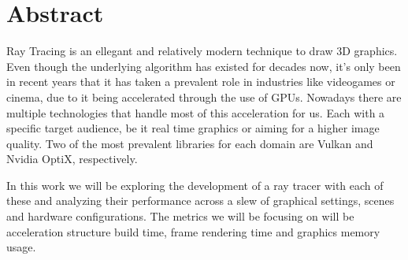 \newpage


\chapter*{Abstract}

Ray Tracing is an ellegant and relatively modern technique to draw 3D graphics. Even though the underlying algorithm has existed for decades now, it's only been in recent years that it has taken a prevalent role in industries like videogames or cinema, due to it being accelerated through the use of GPUs. Nowadays there are multiple technologies that handle most of this acceleration for us. Each with a specific target audience, be it real time graphics or aiming for a higher image quality. Two of the most prevalent libraries for each domain are Vulkan and Nvidia OptiX, respectively. 

In this work we will be exploring the development of a ray tracer with each of these and analyzing their performance across a slew of graphical settings, scenes and hardware configurations. The metrics we will be focusing on will be acceleration structure build time, frame rendering time and graphics memory usage.

